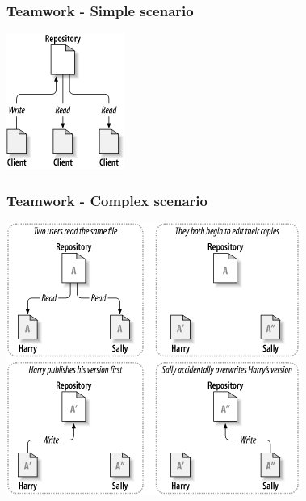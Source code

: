 \documentclass{beamer}
\begin{document}
\begin{frame}
\frametitle{Teamwork - Simple scenario}
\begin{center}
  \includegraphics[width=\textwidth,height=0.6\textheight,keepaspectratio]{imgs/screen06.png}
\end{center}
\end{frame}

\begin{frame}
\frametitle{Teamwork - Complex scenario}
\begin{center}
  \includegraphics[width=\textwidth,height=0.8\textheight,keepaspectratio]{imgs/screen07.png}
\end{center}
\end{frame}
\end{document}
